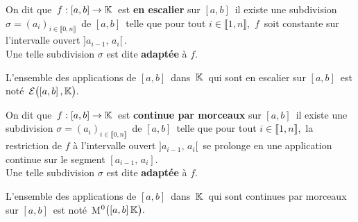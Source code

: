 \vspace{1cm}

On dit que \(\,f:[a,b]\to \mathbb{K}\,\) est \textbf{en escalier} sur $[a,b]\,$ \ssi il existe une subdivision\\
\(\sigma=(a_i)_{i\in \llbracket 0,n \rrbracket}\,\) de $[a,b]\,$ telle que pour tout \(i\in \llbracket 1,n \rrbracket\),\, $f\,$ soit constante sur l'intervalle ouvert \(]a_{i-1},\, a_i[\,\).\vspace{0.1cm}\\
Une telle subdivision $\sigma$ est dite \textbf{adaptée} à $f$.\vspace{0.1cm}\\
\begin{small}
    L'ensemble des applications de $[a,b]\,$ dans $\,\mathbb{K}\,$ qui sont en escalier sur $[a,b]\,$ est noté \(\,\mathcal{E}\bigl([a,b]\,,\mathbb{K}\bigr).\)
\end{small}

\vspace{1cm}

On dit que \(\,f:[a,b]\to \mathbb{K}\,\) est \textbf{continue par morceaux} sur \([a,b]\,\) \ssi il existe une subdivision \(\sigma=(a_i)_{i\in \llbracket 0,n \rrbracket}\,\) de $[a,b]\,$ telle que pour tout \(i\in \llbracket 1,n \rrbracket\),\, la restriction de $f$ à l'intervalle ouvert \(]a_{i-1},\,a_i[\,\) se prolonge en une application continue sur le segment \([a_{i-1},\,a_i].\)\vspace{0.1cm}\\
Une telle subdivision $\sigma$ est dite \textbf{adaptée} à $f$.\vspace{0.1cm}\\
\begin{small}
    L'ensemble des applications de \([a,b]\,\) dans \(\,\mathbb{K}\,\) qui sont continues par morceaux sur \([a,b]\,\) est noté\, M\(^0\bigl([a,b]\,\mathbb{K}\bigr).\)
\end{small}

\vspace{1.3cm}


